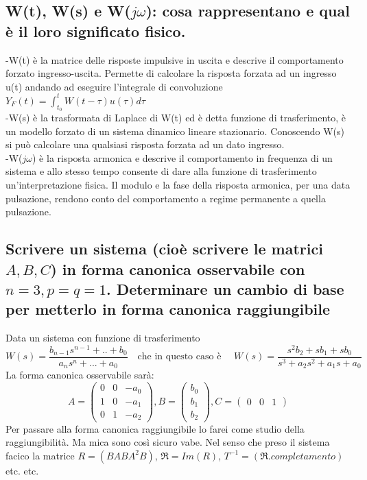 \documentclass{article}
\begin{document}
\subsection{W(t), W(s) e W($j\omega$): cosa rappresentano e qual è il loro significato fisico.}
-W(t) è la matrice delle risposte impulsive in uscita e descrive il comportamento forzato ingresso-uscita. Permette di calcolare la risposta forzata ad un ingresso u(t) andando ad eseguire l'integrale di convoluzione $Y_F(t)=\int_{t_0}^{t} W(t-\tau)u(\tau)d\tau $\\
-W(s) è la trasformata di Laplace di W(t) ed è detta funzione di trasferimento, è un modello forzato di un sistema dinamico lineare stazionario. Conoscendo W(s) si può calcolare una qualsiasi risposta forzata ad un dato ingresso.\\
-W($j\omega$) è la risposta armonica e descrive il comportamento in  frequenza di un sistema e allo stesso tempo consente di dare alla funzione di trasferimento un'interpretazione fisica. Il modulo e la fase della risposta armonica, per una data pulsazione, rendono conto del comportamento a regime permanente a quella pulsazione.


\subsection{Scrivere un sistema (cioè scrivere le matrici $A, B, C$)
in forma canonica osservabile con $n=3, p=q=1$.
Determinare un cambio di base per metterlo in forma canonica raggiungibile}

Data un sistema con funzione di trasferimento 
\[ 
    W(s) = \frac{b_{n-1}s^{n-1}+..+b_0}{a_ns^n+...+a_0}
    \quad\text{che in questo caso è }\quad W(s)=\frac{s^2b_2+sb_1+sb_0}{s^3+a_2s^2+a_1s+a_0}
\]
La forma canonica osservabile sarà:
\[
  A =   \begin{pmatrix}
    0 & 0 & -a_0\\
    1 & 0 & -a_1\\
    0 & 1 & -a_2
    \end{pmatrix},
  B = \begin{pmatrix} b_0\\b_1\\b_2 \end{pmatrix},
  C =  \begin{pmatrix} 0 & 0 &1 \end{pmatrix}
\]
Per passare alla forma canonica raggiungibile lo farei come studio della raggiungibilità.
\small Ma mica sono così sicuro vabe.
\large
Nel senso che preso il sistema facico la matrice $R = (B AB A^2B)$, $\mathfrak{R}=Im(R)$,
$T^{-1} = (\mathfrak{R} .completamento)$ etc. etc.
\end{document}

